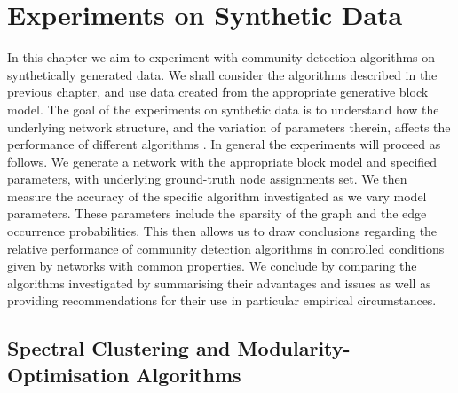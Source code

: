 
\chapter{Experiments on Synthetic Data}

\label{cha:experimentsOnSyntheticData}


In this chapter we aim to experiment with community detection algorithms on synthetically generated data.
We shall consider the algorithms described in the previous chapter, and use data created from the appropriate generative block model.
The goal of the experiments on synthetic data is to understand how the underlying
network structure, and the variation of parameters therein, affects the performance of different algorithms \cite{RLK12}.
In general the experiments will proceed as follows.
We generate a network with the appropriate block model and specified parameters, with underlying ground-truth node assignments set.
We then measure the accuracy of the specific algorithm investigated as we vary model parameters.
These parameters include the sparsity of the graph and the edge occurrence probabilities.
This then allows us to draw conclusions regarding the relative performance of community detection algorithms in controlled conditions given by networks with common properties.
We conclude by comparing the algorithms investigated by summarising their advantages and issues as well as providing recommendations for their use in particular empirical circumstances.


\section{Spectral Clustering and Modularity-Optimisation Algorithms}
\label{sec:spectralClusteringModularityOptimisationAlgorithms}

